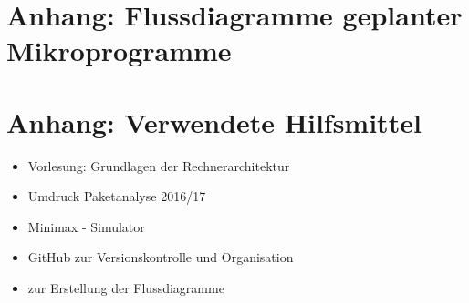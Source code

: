 \documentclass[12pt,titlepage,german,a4]{article}
\begin{document}
    \section{Anhang: Flussdiagramme geplanter Mikroprogramme}

	\newpage
    \section{Anhang: Verwendete Hilfsmittel}
	\begin{itemize}
		\item Vorlesung: Grundlagen der Rechnerarchitektur
		\item Umdruck Paketanalyse 2016/17
		\item Minimax - Simulator
		\item GitHub zur Versionskontrolle und Organisation
		\item {} zur Erstellung der Flussdiagramme
	\end{itemize}
\end{document}
